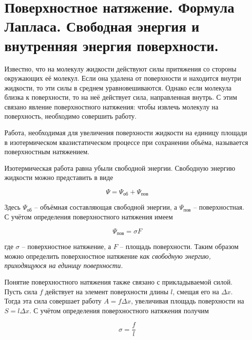 \section{Поверхностное натяжение. Формула Лапласа. Свободная энергия и внутренняя энергия поверхности.}

Известно, что на молекулу жидкости действуют силы притяжения со стороны окружающих её молекул. Если она удалена от поверхности и находится внутри жидкости, то эти силы в среднем уравновешиваются. Однако если молекула близка к поверхности, то на неё действует сила, направленная внутрь. С этим связано явление поверхностного натяжения: чтобы извлечь молекулу на поверхность, необходимо совершить работу.

\begin{definition}
    Работа, необходимая для увеличения поверхности жидкости на единицу площади в изотермическом квазистатическом процессе при сохранении объёма, называется поверхностным натяжением.
\end{definition}

Изотермическая работа равна убыли свободной энергии. Свободную энергию жидкости можно представить в виде

\begin{equation}
    \Psi = \Psi_\text{об} + \Psi_\text{пов}
\end{equation}

\noindent
Здесь $\Psi_\text{об}$ -- объёмная составляющая свободной энергии, а $\Psi_\text{пов}$ -- поверхностная. С учётом определения поверхностного натяжения имеем

\begin{equation}
    \Psi_\text{пов} = \sigma F
\end{equation}

\noindent
где $\sigma$ -- поверхностное натяжение, а $F$ -- площадь поверхности. Таким образом можно определить поверхностное натяжение \textit{ как свободную энергию, приходящуюся на единицу поверхности.}

Понятие поверхностного натяжения также связано с прикладываемой силой. Пусть сила $f$ действует на элемент поверхности длины $l$, смещая его на $\Delta x$. Тогда эта сила совершает работу $A = f \Delta x$, увеличивая площадь поверхности на $S = l \Delta x$. С учётом определения поверхностного натяжения получим

\begin{equation}
    \sigma = \frac{f}{l}
\end{equation}

